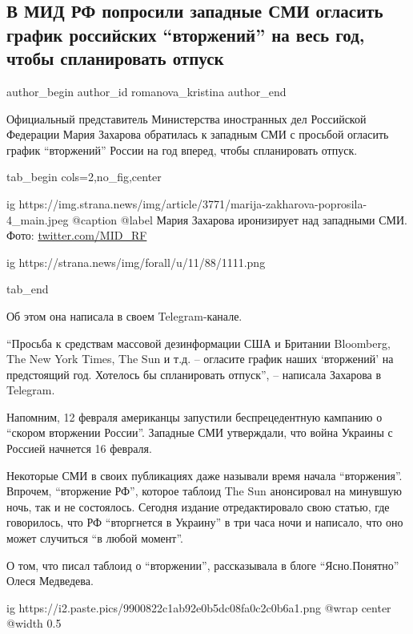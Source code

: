  
 
 
 
 
 
\subsection{В МИД РФ попросили западные СМИ огласить график российских \enquote{вторжений} на весь год, чтобы спланировать отпуск}
\label{sec:15_02_2022.stz.news.ua.strana.4.zaharova_grafik_vtorzhenij}
 
\ifcmt
 author_begin
   author_id romanova_kristina
 author_end
\fi

Официальный представитель Министерства иностранных дел Российской Федерации
Мария Захарова обратилась к западным СМИ с просьбой огласить график \enquote{вторжений}
России на год вперед, чтобы спланировать отпуск.

\ifcmt
tab_begin cols=2,no_fig,center

  ig https://img.strana.news/img/article/3771/marija-zakharova-poprosila-4_main.jpeg
	@caption @label Мария Захарова иронизирует над западными СМИ. Фото: \url{twitter.com/MID_RF}

  ig https://strana.news/img/forall/u/11/88/1111.png

tab_end
\fi

Об этом она написала в своем Telegram-канале.

\enquote{Просьба к средствам массовой дезинформации США и Британии Bloomberg, The New
York Times, The Sun и т.д. – огласите график наших \enquote{вторжений} на предстоящий
год. Хотелось бы спланировать отпуск}, – написала Захарова в Telegram.

Напомним, 12 февраля американцы запустили беспрецедентную кампанию о \enquote{скором
вторжении России}. Западные СМИ утверждали, что война Украины с Россией
начнется 16 февраля. 

Некоторые СМИ в своих публикациях даже называли время начала \enquote{вторжения}.
Впрочем, \enquote{вторжение РФ}, которое таблоид The Sun анонсировал на минувшую ночь,
так и не состоялось. Сегодня издание отредактировало свою статью, где
говорилось, что РФ \enquote{вторгнется в Украину} в три часа ночи и написало, что оно
может случиться \enquote{в любой момент}. 

О том, что писал таблоид о \enquote{вторжении}, рассказывала в блоге \enquote{Ясно.Понятно}
Олеся Медведева.

\ifcmt
  ig https://i2.paste.pics/9900822c1ab92e0b5dc08fa0c2c0b6a1.png
  @wrap center
  @width 0.5
\fi
